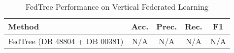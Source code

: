\begin{table}[ht]
  \centering
  \caption{FedTree Performance on Vertical Federated Learning}
  \label{tab:fedtree_vertical_fl}
  \begin{tabular}{lcccc}
  \toprule
  \textbf{Method} & \textbf{Acc.} & \textbf{Prec.} & \textbf{Rec.} & \textbf{F1} \\
  \midrule
  FedTree (DB 48804 + DB 00381) & N/A & N/A & N/A & N/A \\
  \bottomrule
  \end{tabular}
\end{table}